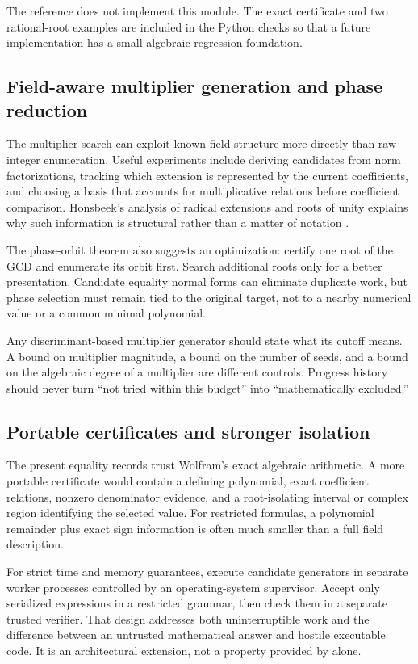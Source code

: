 \documentclass[11pt,letterpaper]{article}
\numberwithin{equation}{section}
\theoremstyle{definition}\newtheorem{definition}[theorem]{Definition}
\theoremstyle{remark}\newtheorem{remark}[theorem]{Remark}
\newcommand{\code}[1]{\texttt{\detokenize{#1}}}
\begin{document}
The reference does not implement this module. The exact certificate and two rational-root examples are included in the Python checks so that a future implementation has a small algebraic regression foundation.

\subsection{Field-aware multiplier generation and phase reduction}
The multiplier search can exploit known field structure more directly than raw integer enumeration. Useful experiments include deriving candidates from norm factorizations, tracking which extension is represented by the current coefficients, and choosing a basis that accounts for multiplicative relations before coefficient comparison. Honsbeek's analysis of radical extensions and roots of unity explains why such information is structural rather than a matter of notation \cite{honsbeek}.

The phase-orbit theorem also suggests an optimization: certify one root of the GCD and enumerate its orbit first. Search additional roots only for a better presentation. Candidate equality normal forms can eliminate duplicate work, but phase selection must remain tied to the original target, not to a nearby numerical value or a common minimal polynomial.

Any discriminant-based multiplier generator should state what its cutoff means. A bound on multiplier magnitude, a bound on the number of seeds, and a bound on the algebraic degree of a multiplier are different controls. Progress history should never turn ``not tried within this budget'' into ``mathematically excluded.''

\subsection{Portable certificates and stronger isolation}
The present equality records trust Wolfram's exact algebraic arithmetic. A more portable certificate would contain a defining polynomial, exact coefficient relations, nonzero denominator evidence, and a root-isolating interval or complex region identifying the selected value. For restricted formulas, a polynomial remainder plus exact sign information is often much smaller than a full field description.

For strict time and memory guarantees, execute candidate generators in separate worker processes controlled by an operating-system supervisor. Accept only serialized expressions in a restricted grammar, then check them in a separate trusted verifier. That design addresses both uninterruptible work and the difference between an untrusted mathematical answer and hostile executable code. It is an architectural extension, not a property provided by \code{TimeConstrained} alone.
\end{document}
